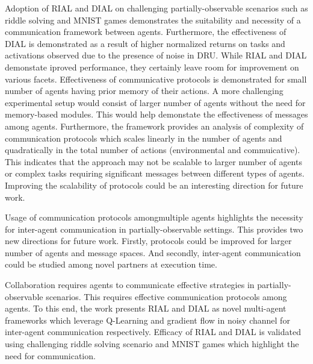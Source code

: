 \documentclass[11pt,letterpaper]{article}
\begin{document}
Adoption of RIAL and DIAL on challenging partially-observable scenarios such as riddle solving and MNIST games demonstrates the suitability and necessity of a communication framework between agents. Furthermore, the effectiveness of DIAL is demonstrated as a result of higher normalized returns on tasks and activations observed due to the presence of noise in DRU. While RIAL and DIAL demonstate iproved performance, they certainly leave room for improvement on various facets. Effectiveness of communicative protocols is demonstrated for small number of agents having prior memory of their actions. A more challenging experimental setup would consist of larger number of agents without the need for memory-based modules. This would help demonstate the effectiveness of messages among agents. Furthermore, the framework provides an analysis of complexity of communication protocols which scales linearly in the number of agents and quadratically in the total number of actions (environmental and commuicative). This indicates that the approach may not be scalable to larger number of agents or complex tasks requiring significant messages between different types of agents. Improving the scalability of protocols could be an interesting direction for future work. 

Usage of communication protocols amongmultiple agents highlights the necessity for inter-agent communication in partially-observable settings. This provides two new directions for future work. Firstly, protocols could be improved for larger number of agents and message spaces. And secondly, inter-agent communication could be studied among novel partners at execution time. 

Collaboration requires agents to communicate effective strategies in partially-observable scenarios. This requires effective communication protocols among agents. To this end, the work presents RIAL and DIAL as novel multi-agent frameworks which leverage Q-Learning and gradient flow in noisy channel for inter-agent communication respectively. Efficacy of RIAL and DIAL is validated using challenging riddle solving scenario and MNIST games which highlight the need for communication. 
\end{document}
